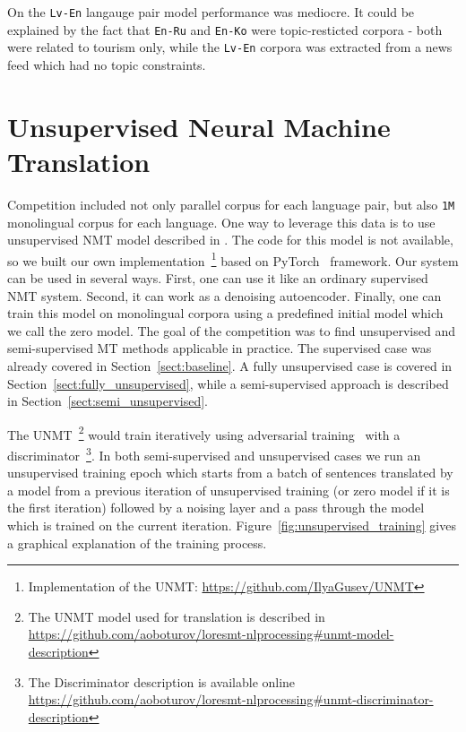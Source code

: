 \documentclass[]{article}
\begin{document}
On the {\tt Lv-En} langauge pair model performance was mediocre.
It could be explained by the fact that {\tt En-Ru} and {\tt En-Ko} were topic-resticted corpora - both were related to tourism only, while the {\tt Lv-En} corpora was extracted from a news feed which had no topic constraints.

\section{Unsupervised Neural Machine Translation}
\label{sect:unmt}

Competition included not only parallel corpus for each language pair, but also {\tt 1M} monolingual corpus for each language.
One way to leverage this data is to use unsupervised \ac{NMT} model described in \cite{DBLP:journals/corr/abs-1711-00043}.
The code for this model is not available, so we built our own implementation~\footnote{Implementation of the \acs{UNMT}: \url{https://github.com/IlyaGusev/UNMT}} based on PyTorch~\citep{paszke2017automatic} framework. 
Our system can be used in several ways.
First, one can use it like an ordinary supervised \ac{NMT} system.
Second, it can work as a denoising autoencoder.
Finally, one can train this model on monolingual corpora using a predefined initial model which we call the zero model.
The goal of the competition was to find unsupervised and semi-supervised \ac{MT} methods applicable in practice.
The supervised case was already covered in Section~\ref{sect:baseline}.
A fully unsupervised case is covered in Section~\ref{sect:fully_unsupervised}, while a semi-supervised approach is described in Section~\ref{sect:semi_unsupervised}.

The \ac{UNMT}~\footnote{The \ac{UNMT} model used for translation is described in \url{https://github.com/aoboturov/loresmt-nlprocessing\#unmt-model-description}} would train iteratively using adversarial training~\citep{goodfellow2016nips} with a discriminator~\footnote{The Discriminator description is available online \url{https://github.com/aoboturov/loresmt-nlprocessing\#unmt-discriminator-description}}.
In both semi-supervised and unsupervised cases we run an unsupervised training epoch which starts from a batch of sentences translated by a model from a previous iteration of unsupervised training (or zero model if it is the first iteration) followed by a noising layer and a pass through the model which is trained on the current iteration.
Figure~\ref{fig:unsupervised_training} gives a graphical explanation of the training process.
\end{document}
